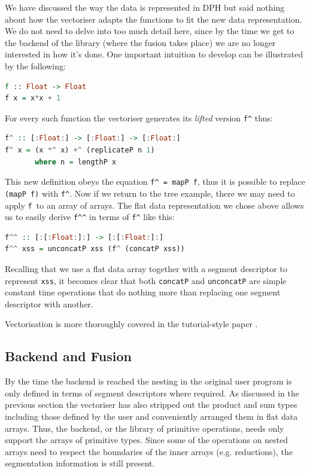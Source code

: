 \documentclass[preamble.tex]{subfiles}
\begin{document}
We have discussed the way the data is represented in DPH but said nothing about how the vectoriser adapts the functions to fit the new data representation. We do not need to delve into too much detail here, since by the time we get to the backend of the library (where the fusion takes place) we are no longer interested in how it's done. One important intuition to develop can be illustrated by the following:

\begin{lstlisting}[basicstyle={\ttfamily},language=Haskell]
f :: Float -> Float
f x = x*x + 1
\end{lstlisting}


For every such function the vectoriser generates its \emph{lifted }version \texttt{f\textasciicircum{}} thus:

\begin{lstlisting}[basicstyle={\ttfamily},language=Haskell]
f^ :: [:Float:] -> [:Float:] -> [:Float:]
f^ x = (x *^ x) +^ (replicateP n 1)
       where n = lengthP x
\end{lstlisting}


This new definition obeys the equation \texttt{f\textasciicircum{} = mapP f}, thus it is possible to replace \texttt{(mapP f)} with \texttt{f\textasciicircum{}}. Now if we return to the tree example, there we may need to apply \texttt{f }to an array of arrays. The flat data representation we chose above allows us to easily derive \texttt{f\textasciicircum{}\textasciicircum{}} in terms of \texttt{f\textasciicircum{}} like this:

\begin{lstlisting}[basicstyle={\ttfamily},language=Haskell]
f^^ :: [:[:Float:]:] -> [:[:Float:]:]
f^^ xss = unconcatP xss (f^ (concatP xss))
\end{lstlisting}


Recalling that we use a flat data array together with a segment descriptor to represent \texttt{xss}, it becomes clear that both \texttt{concatP} and \texttt{unconcatP} are simple constant time operations that do nothing more than replacing one segment descriptor with another.

Vectorisation is more thoroughly covered in the tutorial-style paper \cite{PLKC08}.


\subsection{Backend and Fusion}

By the time the backend is reached the nesting in the original user program is only defined in terms of segment descriptors where required. As discussed in the previous section the vectoriser has also stripped out the product and sum types including those defined by the user and conveniently arranged them in flat data arrays. Thus, the backend, or the library of primitive operations, needs only support the arrays of primitive types. Since some of the operations on nested arrays need to respect the boundaries of the inner arrays (e.g. reductions), the segmentation information is still present.
\end{document}
